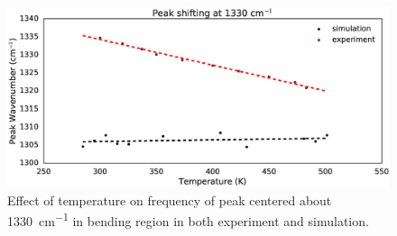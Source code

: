 \begin{figure}
\centering
\includegraphics[width=\linewidth]{1330_peak_shift}
\caption{Effect of temperature on frequency of peak centered about \SI{1330}{cm^{-1}} in bending region in both experiment and simulation.}
\label{fig:1330_peak_shift}
\end{figure}

